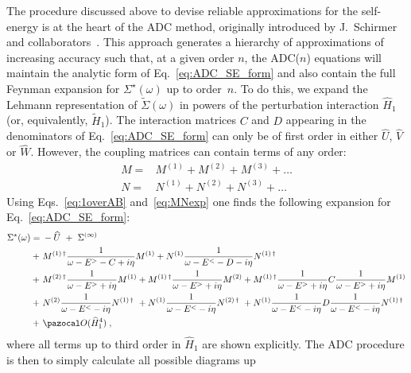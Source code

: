  The  procedure discussed above to devise reliable approximations for the self-energy is at the heart of the
 ADC method, originally introduced by J.~Schirmer and collaborators~\cite{ch11_Schirmer1982ADC2,ch11_Schirmer1983ADCn}.
 This approach  generates  a hierarchy of approximations of increasing accuracy such that,
 at a given order $n$, the ADC($n$) equations will maintain the analytic form of Eq.~\eqref{eq:ADC_SE_form} and
 also contain the full Feynman expansion for $\Sigma^\star(\omega)$ up to order~$n$.
To do this, we expand the Lehmann representation of $\widetilde\Sigma(\omega)$ in powers of the perturbation interaction $\widehat{H}_1$ (or, equivalently, $\widetilde{H}_1$). The interaction matrices 
$C$ and $D$ appearing in the denominators of Eq.~\eqref{eq:ADC_SE_form} can only be of first order in either $\widehat{U}$,  $\widehat{V}$ or $\widehat{W}$. However, the coupling matrices can contain terms of any order:
\begin{align}
  M =& M^{(1)} +  M^{(2)} +  M^{(3)} +  \ldots
   \nonumber  \\
  N =&  N^{(1)} +  N^{(2)} +  N^{(3)} + \ldots  
 \label{eq:MNexp}
\end{align}
Using  Eqs.~\eqref{eq:1overAB}  and~\eqref{eq:MNexp} one finds the following expansion
for Eq.~\eqref{eq:ADC_SE_form}:
\begin{align}
  \Sigma^{\star}(\omega) ={}&  - \widehat{U}  ~+~   \Sigma^{(\infty)} 
  \nonumber \\
   +~& M^{(1) \, \dagger}\frac1{\omega - E^> -C + i \eta}M^{(1)} +N^{(1)}\frac1{\omega - E^< -D - i \eta}N^{(1) \, \dagger}
    \nonumber \\
  +~& M^{(2) \, \dagger}\frac1{\omega - E^> + i \eta}M^{(1)}  +   M^{(1) \, \dagger}\frac1{\omega - E^> + i \eta}M^{(2)}
 +{}  M^{(1) \, \dagger}\frac1{\omega - E^> + i \eta} C \frac1{\omega - E^> + i \eta}M^{(1)}  
    \nonumber \\
  +~& N^{(2)}\frac1{\omega - E^< - i \eta}N^{(1) \, \dagger} ~ +   N^{(1)}\frac1{\omega - E^< - i \eta}N^{(2) \, \dagger}
 ~+{}  N^{(1)}\frac1{\omega - E^< - i \eta} D \frac1{\omega - E^< - i \eta}N^{(1) \, \dagger}  
 \nonumber \\
 +~&   {\pazocal O}({ \widehat{H}_1}^4)  \; ,
 \label{eq:ADC_SE_form_exp}
\end{align}
where all terms up to third order in $\widehat H_1$ are shown explicitly.
The ADC procedure is then to simply calculate all possible diagrams up
